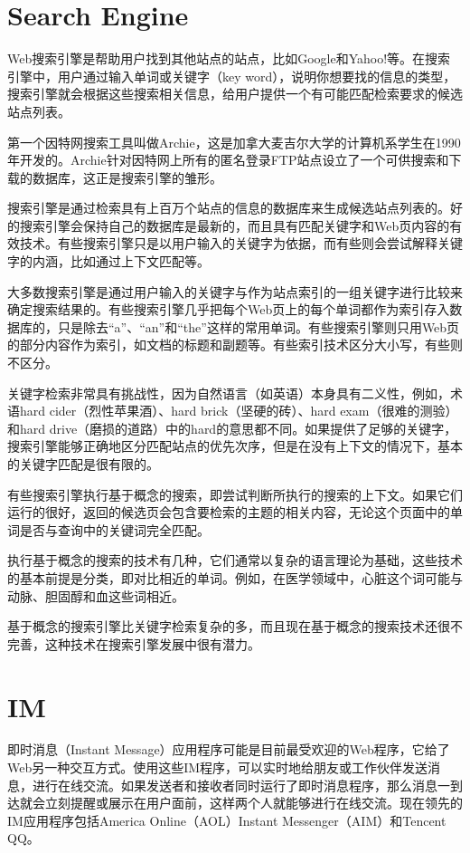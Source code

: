 \section{Search Engine}

Web搜索引擎是帮助用户找到其他站点的站点，比如Google和Yahoo!等。在搜索引擎中，用户通过输入单词或关键字（key word），说明你想要找的信息的类型，搜索引擎就会根据这些搜索相关信息，给用户提供一个有可能匹配检索要求的候选站点列表。

第一个因特网搜索工具叫做Archie，这是加拿大麦吉尔大学的计算机系学生在1990年开发的。Archie针对因特网上所有的匿名登录FTP站点设立了一个可供搜索和下载的数据库，这正是搜索引擎的雏形。

搜索引擎是通过检索具有上百万个站点的信息的数据库来生成候选站点列表的。好的搜索引擎会保持自己的数据库是最新的，而且具有匹配关键字和Web页内容的有效技术。有些搜索引擎只是以用户输入的关键字为依据，而有些则会尝试解释关键字的内涵，比如通过上下文匹配等。

大多数搜索引擎是通过用户输入的关键字与作为站点索引的一组关键字进行比较来确定搜索结果的。有些搜索引擎几乎把每个Web页上的每个单词都作为索引存入数据库的，只是除去“a”、“an”和“the”这样的常用单词。有些搜索引擎则只用Web页的部分内容作为索引，如文档的标题和副题等。有些索引技术区分大小写，有些则不区分。

关键字检索非常具有挑战性，因为自然语言（如英语）本身具有二义性，例如，术语hard cider（烈性苹果酒）、hard brick（坚硬的砖）、hard exam（很难的测验）和hard drive（磨损的道路）中的hard的意思都不同。如果提供了足够的关键字，搜索引擎能够正确地区分匹配站点的优先次序，但是在没有上下文的情况下，基本的关键字匹配是很有限的。

有些搜索引擎执行基于概念的搜索，即尝试判断所执行的搜索的上下文。如果它们运行的很好，返回的候选页会包含要检索的主题的相关内容，无论这个页面中的单词是否与查询中的关键词完全匹配。

执行基于概念的搜索的技术有几种，它们通常以复杂的语言理论为基础，这些技术的基本前提是分类，即对比相近的单词。例如，在医学领域中，心脏这个词可能与动脉、胆固醇和血这些词相近。

基于概念的搜索引擎比关键字检索复杂的多，而且现在基于概念的搜索技术还很不完善，这种技术在搜索引擎发展中很有潜力。



\section{IM}



即时消息（Instant Message）应用程序可能是目前最受欢迎的Web程序，它给了Web另一种交互方式。使用这些IM程序，可以实时地给朋友或工作伙伴发送消息，进行在线交流。如果发送者和接收者同时运行了即时消息程序，那么消息一到达就会立刻提醒或展示在用户面前，这样两个人就能够进行在线交流。现在领先的IM应用程序包括America Online（AOL）Instant Messenger（AIM）和Tencent QQ。

